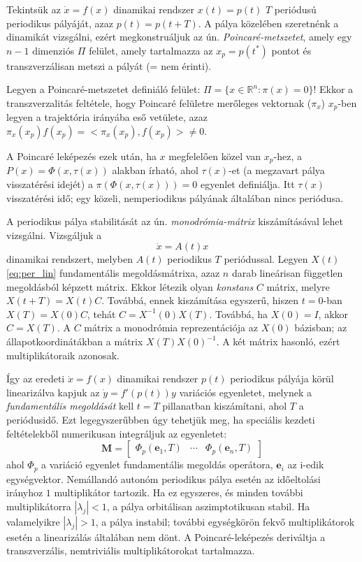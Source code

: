 Tekintsük az $\dot{x}=f(x)$ dinamikai rendszer $x(t)=p(t)$ $T$ periódusú periodikus pályáját, azaz $p(t)=p(t+T)$. A pálya közelében szeretnénk a dinamikát vizsgálni, ezért megkonstruáljuk az ún. \emph{Poincaré-metszetet}, amely egy $n-1$ dimenziós $\Pi$ felület, amely tartalmazza az $x_p=p(t^*)$ pontot és transzverzálisan metszi a pályát (= nem érinti).

Legyen a Poincaré-metszetet definiáló felület: $\Pi = \{x\in\mathbb{R}^n:\pi(x)=0\}$! Ekkor a transzverzalitás feltétele, hogy Poincaré felületre merőleges vektornak ($\pi_x$) $x_p$-ben legyen a trajektória irányába eső vetülete, azaz $\pi_x(x_p) f(x_p)=<\pi_x(x_p), f(x_p)>\neq 0$.

A Poincaré leképezés ezek után, ha $x$ megfelelően közel van $x_p$-hez, a $P(x)=\Phi(x,\tau(x))$ alakban írható, ahol $\tau(x)$-et (a megzavart pálya visszatérési idejét) a $\pi(\Phi(x,\tau(x)))=0$ egyenlet definiálja. Itt $\tau(x)$ visszatérési idő; egy közeli, nemperiodikus pályának általában nincs periódusa.

A periodikus pálya stabilitását az ún. \emph{monodrómia-mátrix} kiszámításával lehet vizsgálni. Vizsgáljuk a
\begin{equation}
\dot{x}=A(t)x
\label{eq:per_lin}
\end{equation}
dinamikai rendszert, melyben $A(t)$ periodikus $T$ periódussal. Legyen $X(t)$ \eqref{eq:per_lin} fundamentális megoldásmátrixa, azaz $n$ darab lineárisan független megoldásból képzett mátrix. Ekkor létezik olyan \emph{konstans} $C$ mátrix, melyre $X(t+T)=X(t)C$. Továbbá, ennek kiszámítása egyszerű, hiszen $t=0$-ban $X(T)=X(0)C$, tehát $C=X^{-1}(0)X(T)$. Továbbá, ha $X(0)=I$, akkor $C=X(T)$. A $C$ mátrix a monodrómia reprezentációja az $X(0)$ bázisban; az állapotkoordinátákban a mátrix $X(T)X(0)^{-1}$. A két mátrix hasonló, ezért multiplikátoraik azonosak.

Így az eredeti $\dot{x}=f(x)$ dinamikai rendszer $p(t)$ periodikus pályája körül linearizálva kapjuk az $\dot y =f'(p(t))y$ variációs egyenletet, melynek a \emph{fundamentális megoldását} kell $t=T$ pillanatban kiszámítani, ahol $T$ a periódusidő. Ezt legegyszerűbben úgy tehetjük meg, ha speciális kezdeti feltételekből numerikusan integráljuk az egyenletet:
\[
\mathbf{M}=\begin{bmatrix}
\Phi_p(\mathbf{e}_1,T) & \cdots & \Phi_p(\mathbf{e}_n,T)
\end{bmatrix}
\]
ahol $\Phi_p$ a variáció egyenlet fundamentális megoldás operátora, $\mathbf{e}_i$ az i-edik egységvektor. Nemállandó autonóm periodikus pálya esetén az időeltolási irányhoz $1$ multiplikátor tartozik. Ha ez egyszeres, és minden további multiplikátorra $|\lambda_j|<1$, a pálya orbitálisan aszimptotikusan stabil. Ha valamelyikre $|\lambda_j|>1$, a pálya instabil; további egységkörön fekvő multiplikátorok esetén a linearizálás általában nem dönt. A Poincaré-leképezés deriváltja a transzverzális, nemtriviális multiplikátorokat tartalmazza.

